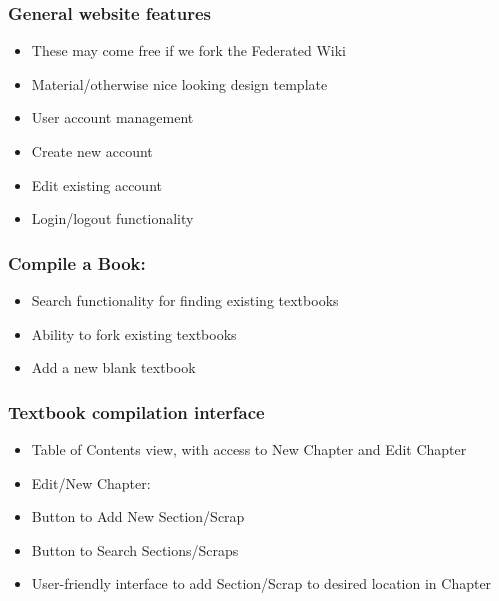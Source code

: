 \documentclass[letterpaper, 10pt, draftclsnofoot, compsoc, onecolumn]{IEEEtran}
\begin{document}
{{{

\subsubsection[System feature 1: General Website Features]{\rmfamily\bfseries\color{black} General website features
}
\begin{itemize}
\item These may come free if we fork the Federated Wiki
\item Material/otherwise nice looking design template
\item User account management
\item Create new account
\item Edit existing account
\item Login/logout functionality
\end{itemize}

\subsubsection[System feature 2: Compile a book]{\rmfamily\bfseries\color{black} Compile a Book:
}
\begin{itemize}
\item Search functionality for finding existing textbooks
\item Ability to fork existing textbooks
\item Add a new blank textbook
\end{itemize}

\subsubsection[System feature 3: Textbook Compilation Interface]{\rmfamily\bfseries\color{black} Textbook compilation interface
}
\begin{itemize}
\item Table of Contents view, with access to New Chapter and Edit Chapter
\item Edit/New Chapter:
\item Button to Add New Section/Scrap
\item Button to Search Sections/Scraps
\item User-friendly interface to add Section/Scrap to desired location in Chapter
\end{itemize}

}}}
\end{document}
